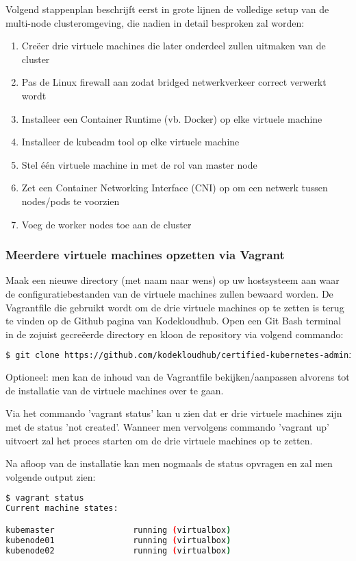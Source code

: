 Volgend stappenplan beschrijft eerst in grote lijnen de volledige setup van de multi-node clusteromgeving, die nadien in detail besproken zal worden: 
\begin{enumerate}
    \item Creëer drie virtuele machines die later onderdeel zullen uitmaken van de cluster
    \item Pas de Linux firewall aan zodat bridged netwerkverkeer correct verwerkt wordt
    \item Installeer een Container Runtime (vb. Docker) op elke virtuele machine    
    \item Installeer de kubeadm tool op elke virtuele machine
    \item Stel één virtuele machine in met de rol van master node
    \item Zet een Container Networking Interface (CNI) op om een netwerk tussen nodes/pods te voorzien
    \item Voeg de worker nodes toe aan de cluster
\end{enumerate}

\subsubsection{Meerdere virtuele machines opzetten via Vagrant}

Maak een nieuwe directory (met naam naar wens) op uw hostsysteem aan waar de configuratiebestanden van de virtuele machines zullen bewaard worden. 
De Vagrantfile die gebruikt wordt om de drie virtuele machines op te zetten is terug te vinden op de Github pagina van Kodekloudhub. Open een Git Bash terminal in de zojuist gecreëerde directory en kloon de repository via volgend commando:  
\begin{lstlisting}[language=bash]
$ git clone https://github.com/kodekloudhub/certified-kubernetes-administrator-course
\end{lstlisting}

Optioneel: men kan de inhoud van de Vagrantfile bekijken/aanpassen alvorens tot de installatie van de virtuele machines over te gaan. 

Via het commando 'vagrant status' kan u zien dat er drie virtuele machines zijn met de status 'not created'. Wanneer men vervolgens commando 'vagrant up' uitvoert zal het proces starten om de drie virtuele machines op te zetten.

Na afloop van de installatie kan men nogmaals de status opvragen en zal men volgende output zien:
\begin{lstlisting}[language=bash]
$ vagrant status
Current machine states:

kubemaster                running (virtualbox)
kubenode01                running (virtualbox)
kubenode02                running (virtualbox)
\end{lstlisting}

